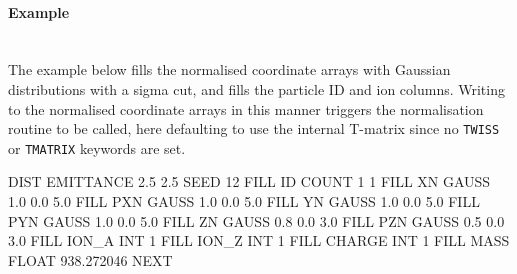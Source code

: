 \paragraph{Example}~\\

The example below fills the normalised coordinate arrays with Gaussian distributions with a sigma cut, and fills the particle ID and ion columns.
Writing to the normalised coordinate arrays in this manner triggers the normalisation routine to be called, here defaulting to use the internal T-matrix since no \texttt{TWISS} or \texttt{TMATRIX} keywords are set.

\begin{cverbatim}
DIST
  EMITTANCE 2.5 2.5
  SEED 12
  FILL ID     COUNT  1   1
  FILL XN     GAUSS  1.0 0.0 5.0
  FILL PXN    GAUSS  1.0 0.0 5.0
  FILL YN     GAUSS  1.0 0.0 5.0
  FILL PYN    GAUSS  1.0 0.0 5.0
  FILL ZN     GAUSS  0.8 0.0 3.0
  FILL PZN    GAUSS  0.5 0.0 3.0
  FILL ION_A  INT    1
  FILL ION_Z  INT    1
  FILL CHARGE INT    1
  FILL MASS   FLOAT  938.272046
NEXT
\end{cverbatim}

